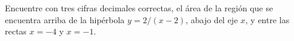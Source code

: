 \item Encuentre con tres cifras decimales correctas, el área de la región que se encuentra arriba de la hipérbola $y = 2/(x - 2)$, abajo del eje $x$, y entre las rectas $x = -4$ y $x = -1$.
